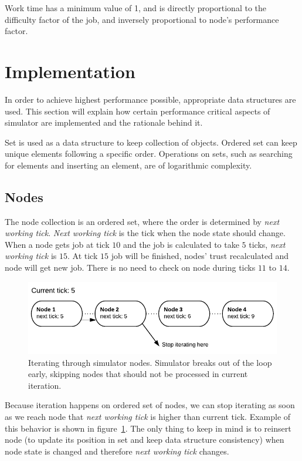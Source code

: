 Work time has a minimum value of 1, and is directly proportional to the difficulty factor of the job, and inversely proportional to node's performance factor.

\section{Implementation}

In order to achieve highest performance possible, appropriate data structures are used. This section will explain how certain performance critical aspects of simulator are implemented and the rationale behind it.

Set is used as a data structure to keep collection of objects. Ordered set can keep unique elements following a specific order. Operations on sets, such as searching for elements and inserting an element, are of logarithmic complexity.

\subsection{Nodes}

The node collection is an ordered set, where the order is determined by \emph{next working tick}. \emph{Next working tick} is the tick when the node state should change. When a node gets job at tick $10$ and the job is calculated to take $5$ ticks, \emph{next working tick} is $15$. At tick $15$ job will be finished, nodes' trust recalculated and node will get new job. There is no need to check on node during ticks $11$ to $14$.

\begin{figure}
\centering
\includegraphics{diagrams/SimulatorNodes.pdf}
\caption{Iterating through simulator nodes. Simulator breaks out of the loop early, skipping nodes that should not be processed in current iteration.}
\label{f:simnodes}
\end{figure}

Because iteration happens on ordered set of nodes, we can stop iterating as soon as we reach node that \emph{next working tick} is higher than current tick. Example of this behavior is shown in figure~\ref{f:simnodes}. The only thing to keep in mind is to reinsert node (to update its position in set and keep data structure consistency) when node state is changed and therefore \emph{next working tick} changes.


